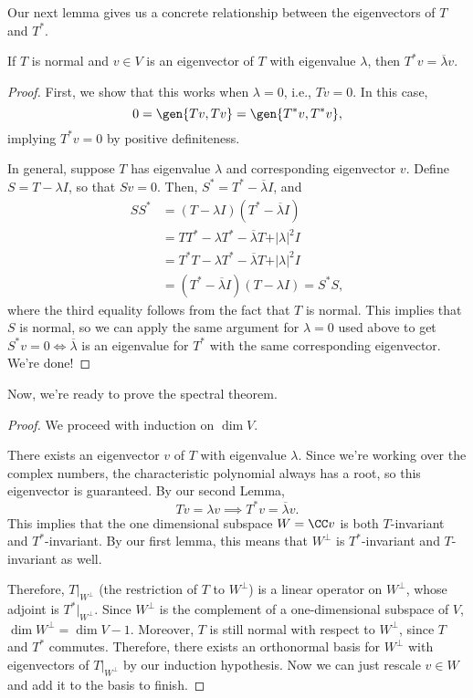 Our next lemma gives us a concrete relationship between the eigenvectors of $T$ and $T^*$. 

\begin{theorem}
\lemlabel

If $T$ is normal and $v\in V$ is an eigenvector of $T$ with eigenvalue $\lambda$, then $T^*v = \overline{\lambda}v$. 
\end{theorem}

\begin{proof}
First, we show that this works when $\lambda = 0$, i.e., $Tv=0$. In this case, 
\[0=\gen{Tv, Tv} = \gen{T^*v, T^*v},\]
implying $T^*v=0$ by positive definiteness. 

In general, suppose $T$ has eigenvalue $\lambda$ and corresponding eigenvector $v$. Define $S = T-\lambda I$, so that $Sv=0$. Then, $S^* = T^* - \overline{\lambda}I$, and 
\begin{align*}
    SS^* &= (T-\lambda I)(T^* - \overline{\lambda}I) \\
    &= TT^* - \lambda T^* - \overline{\lambda}T + \vert \lambda\vert^2I \\
    &= T^*T - \lambda T^* - \overline{\lambda}T + \vert \lambda\vert^2I \\
    &= (T^*-\overline{\lambda}I)(T-\lambda I) = S^*S,
\end{align*}
where the third equality follows from the fact that $T$ is normal. This implies that $S$ is normal, so we can apply the same argument for $\lambda=0$ used above to get $S^*v=0\iff \overline{\lambda}$ is an eigenvalue for $T^*$ with the same corresponding eigenvector. We're done!
\end{proof}

Now, we're ready to prove the spectral theorem.
\begin{proof}
We proceed with induction on $\dim V$. 

There exists an eigenvector $v$ of $T$ with eigenvalue $\lambda$. Since we're working over the complex numbers, the characteristic polynomial always has a root, so this eigenvector is guaranteed. By our second Lemma, 
\[Tv = \lambda v\implies T^*v = \overline{\lambda} v.\]
This implies that the one dimensional subspace $W = \CC v$ is both $T$-invariant and $T^*$-invariant. By our first lemma, this means that $W^{\perp}$ is $T^*$-invariant and $T$-invariant as well. 

Therefore, $T\vert_{W^{\perp}}$ (the restriction of $T$ to $W^{\perp}$) is a linear operator on $W^{\perp}$, whose adjoint is $T^*\vert_{W^{\perp}}$. Since $W^{\perp}$ is the complement of a one-dimensional subspace of $V$, $\dim W^{\perp} = \dim V-1$. Moreover, $T$ is still normal with respect to $W^{\perp}$, since $T$ and $T^*$ commutes. Therefore, there exists an orthonormal basis for $W^{\perp}$ with eigenvectors of $T\vert _{W^{\perp}}$ by our induction hypothesis. Now we can just rescale $v\in W$ and add it to the basis to finish. 
\end{proof}

